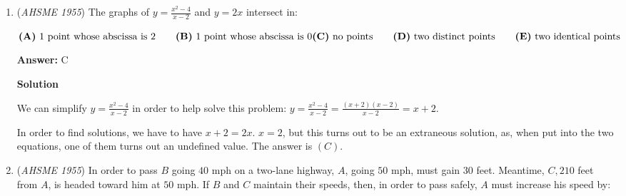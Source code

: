 \begin{enumerate}
 Therefore, $FG = FE + EG = \frac{1}{2}AB + \frac{1}{4}AB = \frac{3}{4}AB$, so \textbf{(D)} is correct.

 
            \begin{itemize}
        \item \textbf{Statement (E):} Since $G$ is the midpoint of $BH$, segment $FG$ connects vertex $F$ to the midpoint of the opposite side in $\triangle BFH$. Thus, $FG$ is a median of $\triangle BFH$, making \textbf{(E)} correct.
            \end{itemize}
            
            \begin{itemize}
        \item \textbf{Statement (B):} $HE = AF = \frac{1}{2}AC$, whereas $HG = \frac{1}{2}BH$. Since $AC$ and $BH$ are not equal in a general triangle, $HE = HG$ is not necessarily correct.
            \end{itemize}
            Thus, the statement that is not necessarily correct is $\textbf{(B)}$.

 


	\item (\textit{AHSME 1955}) The graphs of $y=\frac{x^2-4}{x-2}$ and $y=2x$ intersect in: 


 $\textbf{(A)}\ \text{1 point whose abscissa is 2}\qquad\textbf{(B)}\ \text{1 point whose abscissa is 0}\\ \textbf{(C)}\ \text{no points}\qquad\textbf{(D)}\ \text{two distinct points}\qquad\textbf{(E)}\ \text{two identical points}$

 \textbf{Answer: }C



\textbf{Solution}

We can simplify $y=\frac{x^2-4}{x-2}$ in order to help solve this problem:  $y=\frac{x^2-4}{x-2}=\frac{(x+2)(x-2)}{x-2}=x+2$.

 In order to find solutions, we have to have $x+2=2x$. $x=2$, but this turns out to be an extraneous solution, as, when put into the two equations, one of them turns out an undefined value. The answer is $\boxed{(C)}$.

 


	\item (\textit{AHSME 1955}) In order to pass $B$ going $40$ mph on a two-lane highway, $A$, going $50$ mph, must gain $30$ feet. 
Meantime, $C, 210$ feet from $A$, is headed toward him at $50$ mph. If $B$ and $C$ maintain their speeds, 
then, in order to pass safely, $A$ must increase his speed by: 



\end{enumerate}
